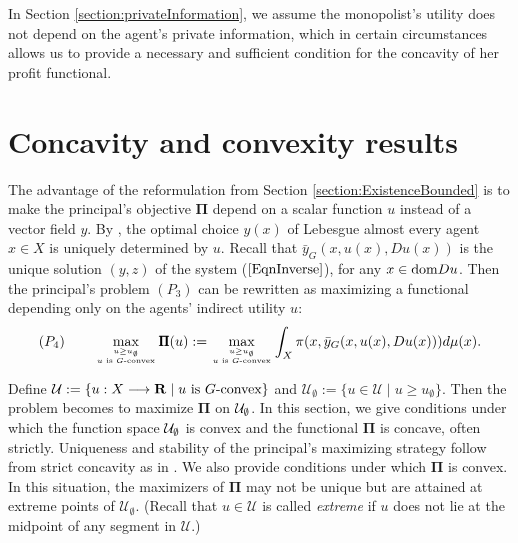 \medskip


%


In Section \ref{section:privateInformation},  we assume the monopolist's utility does not depend on the agent's private information, which in certain circumstances allows us to provide a necessary and sufficient condition for the concavity of her profit functional.
\medskip





\section{Concavity and convexity results}\label{section:concavity}
The advantage of the reformulation from Section \ref{section:ExistenceBounded} is to make the principal's objective $\pmb \Pi$ 
depend on a scalar function $u$ instead of a vector field $y$.
By \Gone, the optimal choice $y(x)$ of   Lebesgue almost every agent $x\in X$
is uniquely determined by $u$.  Recall that $\bar{y}_G(x, u(x), Du(x))$ is the unique solution $(y,z)$ of the system ($\ref{EqnInverse}$), for any $x\in {\mathop{\rm dom}} Du$. 
Then the principal's problem $(P_3)$ can be rewritten as maximizing a functional 
depending only on the agents' indirect utility $u$:
\begin{equation}\label{eqn:principalFinal}
	(P_4) \ \ \ \ \ \  \max\limits_{ u\ge u_{\emptyset} \atop \text{$u$ is $G$-convex}} \pmb\Pi(u) := \max\limits_{u \ge u_{\emptyset} \atop \text{$u$ is $G$-convex}} \int_X \pi(x, \bar{y}_G(x, u(x), Du(x)))  d \mu(x) .
\end{equation}
\medskip

Define $\mathcal{U}:=\{u:X\longrightarrow {\mathbf R} \mid  u \text{ is } G\text{-convex}\}$
and $\mathcal{U}_{\emptyset}:=\{u \in \mathcal{U}\mid  u\ge u_{\emptyset}\}$. 
Then the problem becomes to maximize $\pmb\Pi$ on $\mathcal{U}_{\emptyset}$. 
In this section, we give conditions under which the function space $\mathcal{U}_{\emptyset}$ 
is convex and the functional $\pmb\Pi$ is concave, often strictly.
Uniqueness and stability of the principal's maximizing strategy follow from strict concavity as in \cite{FigalliKimMcCann11}. We also provide conditions under which $\pmb\Pi$ is convex. In this situation, the maximizers of $\pmb\Pi$ may not be unique but are attained at extreme points of 
$\mathcal{U}_{\emptyset}$. (Recall that $u \in \mathcal{U}$ is called {\em extreme} if 
$u$ does not lie at the midpoint of any segment in $\mathcal{U}$.)
\medskip


